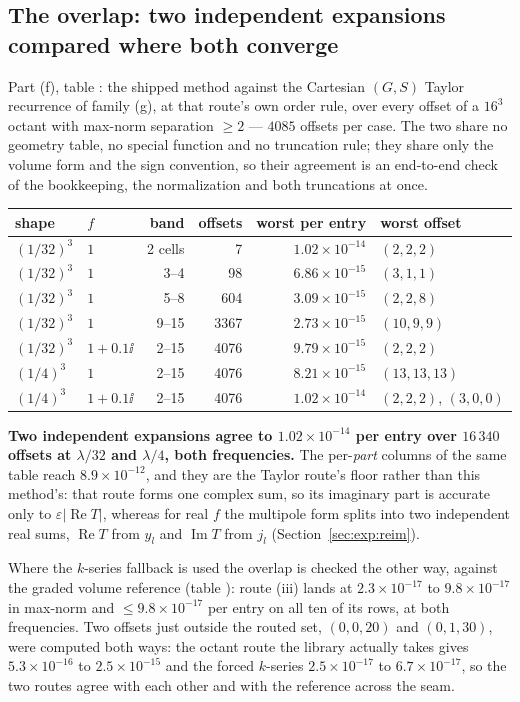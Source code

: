 \subsection{The overlap: two independent expansions compared where both converge}
\label{sec:ver:ovl}

Part (f), table : the shipped method against the Cartesian
$(G,S)$ Taylor recurrence of family (g), at that route's own order rule, over every offset
of a $16^3$ octant with max-norm separation $\ge 2$ --- $4085$ offsets per case. The two
share no geometry table, no special function and no truncation rule; they share only the
volume form and the  sign convention, so their agreement is an end-to-end
check of the bookkeeping, the normalization and both truncations at once.

\begin{center}\small
\begin{tabular}{@{}llrrrl@{}}
\toprule
shape & $f$ & band & offsets & worst per entry & worst offset\\
\midrule
$(1/32)^3$ & $1$ & 2 cells & 7 & $1.02\times10^{-14}$ & $(2,2,2)$\\
$(1/32)^3$ & $1$ & 3--4 & 98 & $6.86\times10^{-15}$ & $(3,1,1)$\\
$(1/32)^3$ & $1$ & 5--8 & 604 & $3.09\times10^{-15}$ & $(2,2,8)$\\
$(1/32)^3$ & $1$ & 9--15 & 3367 & $2.73\times10^{-15}$ & $(10,9,9)$\\
$(1/32)^3$ & $1+0.1\ii$ & 2--15 & 4076 & $9.79\times10^{-15}$ & $(2,2,2)$\\
$(1/4)^3$ & $1$ & 2--15 & 4076 & $8.21\times10^{-15}$ & $(13,13,13)$\\
$(1/4)^3$ & $1+0.1\ii$ & 2--15 & 4076 & $1.02\times10^{-14}$ & $(2,2,2)$, $(3,0,0)$\\
\bottomrule
\end{tabular}
\end{center}

\noindent
\textbf{Two independent expansions agree to $1.02\times10^{-14}$ per entry over $16\,340$
offsets at $\lambda/32$ and $\lambda/4$, both frequencies.} The per-\emph{part} columns of
the same table reach $8.9\times10^{-12}$, and they are the Taylor route's floor rather than
this method's: that route forms one complex sum, so its imaginary part is accurate only to
$\varepsilon|\operatorname{Re}T|$, whereas for real $f$ the multipole form splits into two
independent real sums, $\operatorname{Re}T$ from $y_l$ and $\operatorname{Im}T$ from $j_l$
(Section~\ref{sec:exp:reim}).

Where the $k$-series fallback is used the overlap is checked the other way, against the
graded volume reference (table ): route (iii) lands at
$2.3\times10^{-17}$ to $9.8\times10^{-17}$ in max-norm and $\le 9.8\times10^{-17}$ per
entry on all ten of its rows, at both frequencies. Two offsets just outside the routed set,
$(0,0,20)$ and $(0,1,30)$, were computed both ways: the octant route the library actually
takes gives $5.3\times10^{-16}$ to $2.5\times10^{-15}$ and the forced $k$-series
$2.5\times10^{-17}$ to $6.7\times10^{-17}$, so the two routes agree with each other and with
the reference across the seam.
